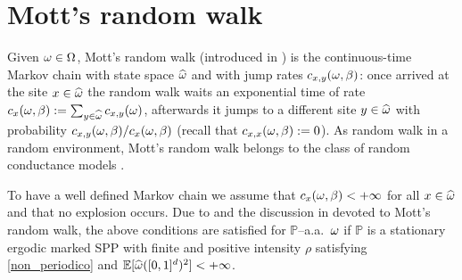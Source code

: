 \documentclass[12pt,a4paper,reqno]{amsart}
\newcommand{\bbE}{{\ensuremath{\mathbb E}} }
\newcommand{\bbP}{{\ensuremath{\mathbb P}} }
\let\O=\Omega \let\P=\Pi   \let\Ps=\Psi \let\Si=\Sigma \let\X=\Xi
\begin{document}
%
%
%
%


\section{Mott's random walk}\label{sec_mott_rw}
Given $\o \in \O$, Mott's random walk (introduced in \cite{FSS}) is the continuous-time 
Markov chain with state space $\widehat{\omega}$ and with jump rates $c_{x,y}(\omega,\beta)$: once arrived at the site $x\in \widehat{\omega}$ the random walk waits an exponential time of rate $c_x(\omega,\beta):=\sum_{y\in \widehat{\omega}}c_{x,y}(\omega)$, afterwards it jumps to a different site $y\in \widehat{\omega}$ with probability $c_{x,y}(\omega,\beta)/c_x(\omega,\beta)$ (recall that $c_{x,x}(\omega,\beta):=0$). As random walk in a random environment, Mott's random walk  belongs to the class of random conductance models \cite{Bis}.
 
 To have a well defined Markov chain we assume that $c_{x}(\omega,\beta)<+\infty$ for all $x\in \widehat{\omega}$ and that no explosion occurs. Due to \cite[Lemma~3.5]{Fhom1} and the discussion 
in \cite[Section~5.4]{Fhom1} devoted to Mott's random walk, the above  conditions are satisfied for $\bbP$--a.a.~$\omega$ if $\bbP$ is a stationary ergodic  marked SPP with finite and positive intensity $\rho$ satisfying \eqref{non_periodico} and $\bbE[ \widehat{\o} ([0,1]^d)^2 ]  <+\infty$. 
\end{document}
